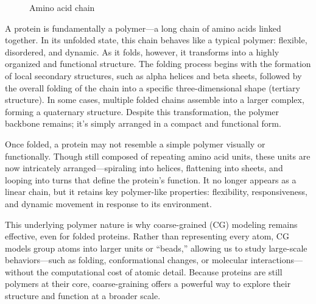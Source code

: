 \documentclass[12pt]{article}
\begin{document}
\begin{flushleft}
\begin{figure}[!ht]
  \centering
  
  \caption{Amino acid chain}
\end{figure}

A protein is fundamentally a polymer—a long chain of amino acids linked together. In its unfolded state, this chain behaves like a typical polymer: flexible, disordered, and dynamic. As it folds, however, it transforms into a highly organized and functional structure. The folding process begins with the formation of local secondary structures, such as alpha helices and beta sheets, followed by the overall folding of the chain into a specific three-dimensional shape (tertiary structure). In some cases, multiple folded chains assemble into a larger complex, forming a quaternary structure. Despite this transformation, the polymer backbone remains; it’s simply arranged in a compact and functional form.

Once folded, a protein may not resemble a simple polymer visually or functionally. Though still composed of repeating amino acid units, these units are now intricately arranged—spiraling into helices, flattening into sheets, and looping into turns that define the protein's function. It no longer appears as a linear chain, but it retains key polymer-like properties: flexibility, responsiveness, and dynamic movement in response to its environment.

This underlying polymer nature is why coarse-grained (CG) modeling remains effective, even for folded proteins. Rather than representing every atom, CG models group atoms into larger units or “beads,” allowing us to study large-scale behaviors—such as folding, conformational changes, or molecular interactions—without the computational cost of atomic detail. Because proteins are still polymers at their core, coarse-graining offers a powerful way to explore their structure and function at a broader scale.



\end{flushleft}
\end{document}
